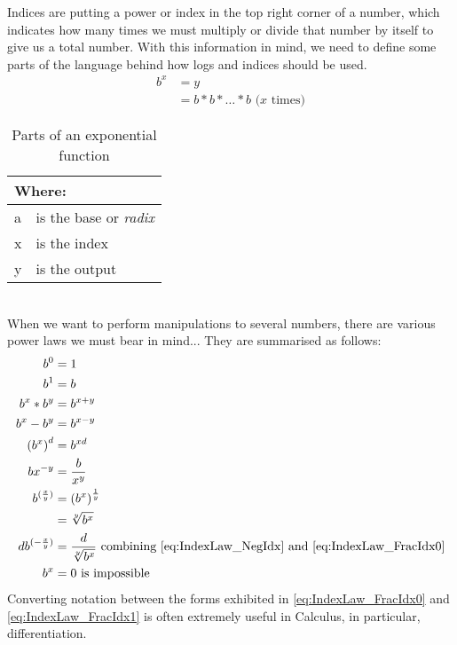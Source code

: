 Indices are putting a power or index in the top right corner of a number,
which indicates how many times we must multiply or divide that number by
itself to give us a total number. With this information in mind, we need to
define some parts of the language behind how logs and indices should be
used.
\begin{align}
  {b}^{x} & = y \label{eq:IdxForm} \\
          & = b * b * \ldots * b \text{ ($x$ times)}
\end{align}
\begin{table}[!hbt]
\label{tab:PartsOfAnExponential}
\begin{tabularx}{\linewidth}{| l X |}
\hline
\multicolumn{2}{|l|}{Where:} \\
\hline \hline
a & is the base or \emph{radix}\\
x & is the index\\
y & is the output\\
\hline
\end{tabularx}
\caption{Parts of an exponential function}
\end{table}
\\
When we want to perform manipulations to several numbers, there are various
power laws we must bear in mind... They are summarised as follows:
\begin{align}
  {b}^{0}               & = 1 \label{eq:IndexLaw_Power0} \\
  {b}^{1}               & = b \label{eq:IndexLaw_Power1} \\
  {b}^{x} * {b}^{y}     & = {b}^{x+y} \label{eq:IndexLaw_AddIdxs} \\
  {b}^{x} - {b}^{y}     & = {b}^{x-y} \label{eq:IndexLaw_SubIdxs} \\
  {({b}^{x})}^{d}       & = {b}^{xd} \label{eq:IndexLaw_MultIdxs} \\
  b{x}^{-y}             & = \frac{b}{{x}^{y}} \label{eq:IndexLaw_NegIdx} \\
  {b}^{(\frac{x}{y})}   & = {({b}^{x})}^{\frac{1}{y}}
                            \label{eq:IndexLaw_FracIdx0} \\
                        & = \sqrt[y]{{b}^{x}} \label{eq:IndexLaw_FracIdx1}\\
  d{b}^{(-\frac{x}{y})} & = \frac{d}{\sqrt[y]{{b}^{x}}} ~ \text{combining \eqref{eq:IndexLaw_NegIdx} and \eqref{eq:IndexLaw_FracIdx0}} \\
  {b}^{x}               & = 0 ~ \text{is impossible} \label{eq:IndexLaw_EqualsZero}
\end{align}
Converting notation between the forms exhibited in
\ref{eq:IndexLaw_FracIdx0} and \ref{eq:IndexLaw_FracIdx1} is often
extremely useful in Calculus, in particular, differentiation.

